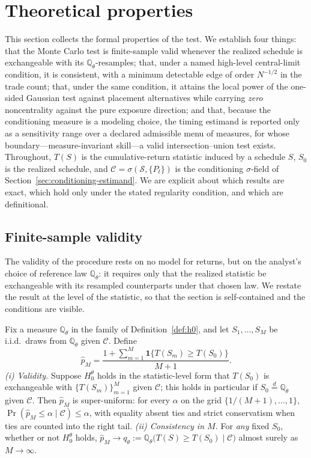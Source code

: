 \section{Theoretical properties}
\label{sec:theory}

This section collects the formal properties of the test. We establish four
things: that the Monte Carlo test is finite-sample valid whenever the realized
schedule is exchangeable with its $\mathbb{Q}_\theta$-resamples; that, under a
named high-level central-limit condition, it is consistent, with a minimum
detectable edge of order $N^{-1/2}$ in the trade count; that, under the same
condition, it attains the local power of the one-sided Gaussian test against
placement alternatives while carrying \emph{zero} noncentrality against the pure
exposure direction; and that, because the conditioning measure is a modeling
choice, the timing estimand is reported only as a sensitivity range over a
declared admissible menu of measures, for whose boundary---measure-invariant
skill---a valid intersection--union test exists. Throughout, $T(S)$ is the
cumulative-return statistic induced by a schedule $S$, $S_0$ is the realized
schedule, and $\mathcal C=\sigma(\mathcal S,\{P_t\})$ is the conditioning
$\sigma$-field of Section~\ref{sec:conditioning-estimand}. We are explicit about
which results are exact, which hold only under the stated regularity condition,
and which are definitional.

\subsection{Finite-sample validity}
\label{sec:fs-validity}

The validity of the procedure rests on no model for returns, but on the
analyst's choice of reference law $\mathbb{Q}_\theta$: it requires only that the
realized statistic be exchangeable with its resampled counterparts under that
chosen law. We restate the result at the level of the statistic, so that the
section is self-contained and the conditions are visible.

\begin{proposition}
\label{prop:q-validity}
Fix a measure $\mathbb{Q}_\theta$ in the family of Definition~\ref{def:h0}, and
let $S_1,\dots,S_M$ be i.i.d.\ draws from $\mathbb{Q}_\theta$ given $\mathcal C$.
Define
\[
\hat p_M
=\frac{1+\sum_{m=1}^{M}\mathbf 1\{T(S_m)\ge T(S_0)\}}{M+1}.
\]
\emph{(i) Validity.} Suppose $H_0^\theta$ holds in the statistic-level form that
$T(S_0)$ is exchangeable with $\{T(S_m)\}_{m=1}^{M}$ given $\mathcal C$; this
holds in particular if $S_0\stackrel{d}{=}\mathbb{Q}_\theta$ given $\mathcal C$.
Then $\hat p_M$ is super-uniform: for every $\alpha$ on the grid
$\{1/(M+1),\dots,1\}$, $\Pr(\hat p_M\le\alpha\mid\mathcal C)\le\alpha$, with
equality absent ties and strict conservatism when ties are counted into the
right tail.
\emph{(ii) Consistency in $M$.} For \emph{any} fixed $S_0$, whether or not
$H_0^\theta$ holds, $\hat p_M\to q_\theta:=\mathbb{Q}_\theta\big(T(S)\ge
T(S_0)\mid\mathcal C\big)$ almost surely as $M\to\infty$.
\end{proposition}

